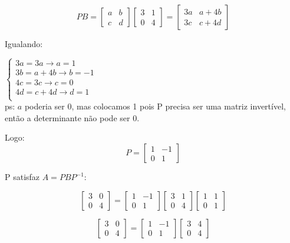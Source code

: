 \documentclass[leqno]{article}
\numberwithin{equation}{section}
\begin{document}
\begin{enumerate}
\begin{enumerate}
\begin{sol}
				$$PB = \begin{bmatrix}
					a & b \\
					c & d
				\end{bmatrix}\begin{bmatrix}
					3 & 1 \\
					0 & 4
				\end{bmatrix} = \begin{bmatrix}
					3a & a + 4b \\
					3c & c + 4d
				\end{bmatrix}$$
			
			Igualando:
			
			$
			\left\{
			\begin {array}{l}
			3a = 3a \longrightarrow a = 1\\
			3b = a + 4b \longrightarrow b = -1\\
			4c = 3c \longrightarrow c = 0\\
			4d = c + 4d \longrightarrow d = 1\\
			\end{array}
			\right.
			$\\ 
		
			ps: $a$ poderia ser 0, mas colocamos 1 pois P precisa ser uma matriz invertível, então a determinante não pode ser 0.
			
			Logo: $$P = \begin{bmatrix}
				1 & -1 \\
				0 & 1
			\end{bmatrix}$$
			
			P satisfaz $A = PBP^{-1}$:
		
			$$\begin{bmatrix}
				3 & 0 \\
				0 & 4
			\end{bmatrix} = \begin{bmatrix}
				1 & -1 \\
				0 & 1
			\end{bmatrix}\begin{bmatrix}
				3 & 1 \\
				0 & 4
			\end{bmatrix}\begin{bmatrix}
				1 & 1 \\
				0 & 1
			\end{bmatrix}$$
		
			$$\begin{bmatrix}
				3 & 0 \\
				0 & 4
			\end{bmatrix} = \begin{bmatrix}
				1 & -1 \\
				0 & 1
			\end{bmatrix}\begin{bmatrix}
				3 & 4 \\
				0 & 4
			\end{bmatrix}$$
			

\end{sol}
\end{enumerate}
\end{enumerate}
\end{document}
